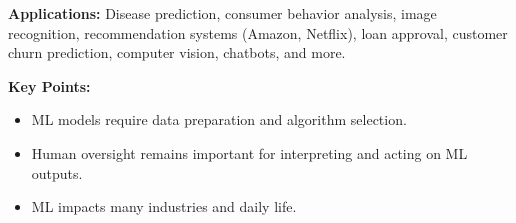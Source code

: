 \documentclass{article}
\begin{document}
\textbf{Applications:} Disease prediction, consumer behavior analysis, image recognition, recommendation systems (Amazon, Netflix), loan approval, customer churn prediction, computer vision, chatbots, and more.

\textbf{Key Points:}
\begin{itemize}
    \item ML models require data preparation and algorithm selection.
    \item Human oversight remains important for interpreting and acting on ML outputs.
    \item ML impacts many industries and daily life.
\end{itemize}
\end{document}
